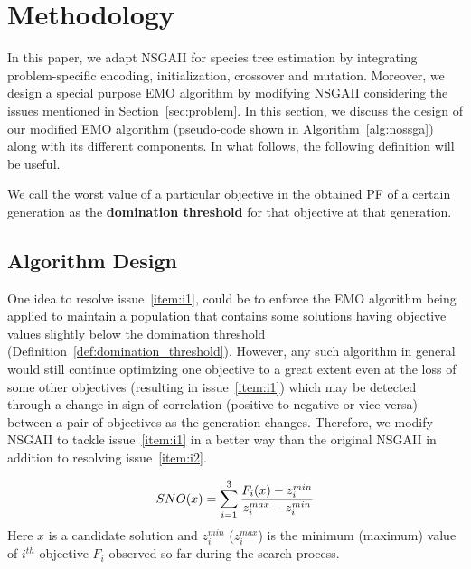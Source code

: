 \section{Methodology}
\label{sec:method}
In this paper, we adapt NSGAII for species tree estimation by integrating problem-specific encoding, initialization, crossover and mutation. Moreover, we design a special purpose EMO algorithm by modifying NSGAII considering the issues mentioned in Section~\ref{sec:problem}. In this section, we discuss the design of our modified EMO algorithm (pseudo-code shown in Algorithm~\ref{alg:nossga}) along with its different components. In what follows, the following definition will be useful. %

\begin{definition}\label{def:domination_threshold}
	\small
	We call the worst value of a particular objective in the obtained PF of a certain generation as the \textbf{domination threshold} for that objective at that generation.
\end{definition}

\subsection{Algorithm Design}
One idea to resolve issue~\ref{item:i1}, could be to enforce the EMO algorithm being applied to maintain a population that contains some solutions having objective values slightly below the domination threshold (Definition~\ref{def:domination_threshold}). However, any such algorithm in general would still
continue optimizing one objective to a great extent even at the loss of some other objectives (resulting in issue~\ref{item:i1}) which may be detected through a change in sign of correlation (positive to negative or vice versa)  between a pair of objectives as the generation changes. 
Therefore, we modify NSGAII to tackle issue~\ref{item:i1} in a better way than the original NSGAII in addition to resolving issue~\ref{item:i2}.  

\begin{equation}\label{eqn:nos}
\small
SNO(x) = \sum_{i=1}^{3} \frac{F_i(x)-z_i^{min}}{z_i^{max}-z_i^{min}}
\end{equation}
Here $x$ is a candidate solution and $z_i^{min}$ ($z_i^{max}$) is the minimum (maximum) value of $i^{th}$ objective $F_i$ observed so far during the search process.

